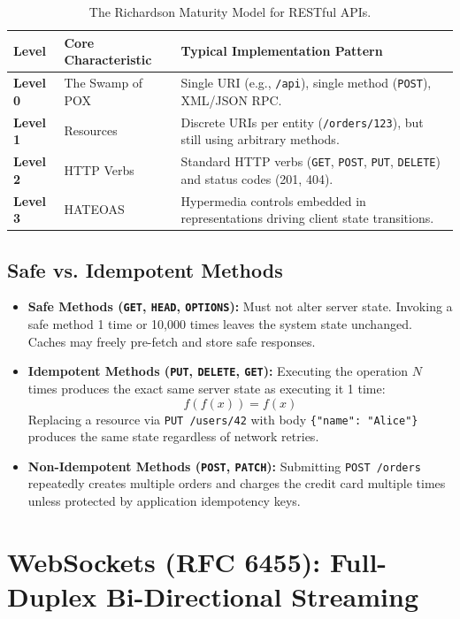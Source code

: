 \begin{table}[htbp]
\centering
\small\sffamily
\begin{tabular}{@{}lll@{}}
\toprule
\textbf{Level} & \textbf{Core Characteristic} & \textbf{Typical Implementation Pattern} \\ \midrule
\textbf{Level 0} & The Swamp of POX & Single URI (e.g., \texttt{/api}), single method (\texttt{POST}), XML/JSON RPC. \\
\textbf{Level 1} & Resources & Discrete URIs per entity (\texttt{/orders/123}), but still using arbitrary methods. \\
\textbf{Level 2} & HTTP Verbs & Standard HTTP verbs (\texttt{GET}, \texttt{POST}, \texttt{PUT}, \texttt{DELETE}) and status codes (201, 404). \\
\textbf{Level 3} & HATEOAS & Hypermedia controls embedded in representations driving client state transitions. \\ \bottomrule
\end{tabular}
\caption{The Richardson Maturity Model for RESTful APIs.}
\label{tab:richardson}
\end{table}

\subsection{Safe vs. Idempotent Methods}

\begin{itemize}[leftmargin=15pt]
  \item \textbf{Safe Methods (\texttt{GET}, \texttt{HEAD}, \texttt{OPTIONS}):} Must not alter server state. Invoking a safe method 1 time or 10,000 times leaves the system state unchanged. Caches may freely pre-fetch and store safe responses.
  \item \textbf{Idempotent Methods (\texttt{PUT}, \texttt{DELETE}, \texttt{GET}):} Executing the operation $N$ times produces the exact same server state as executing it 1 time:
  $$f(f(x)) = f(x)$$
  Replacing a resource via \texttt{PUT /users/42} with body \texttt{\{"name": "Alice"\}} produces the same state regardless of network retries.
  \item \textbf{Non-Idempotent Methods (\texttt{POST}, \texttt{PATCH}):} Submitting \texttt{POST /orders} repeatedly creates multiple orders and charges the credit card multiple times unless protected by application idempotency keys.
\end{itemize}

\section{WebSockets (RFC 6455): Full-Duplex Bi-Directional Streaming}

